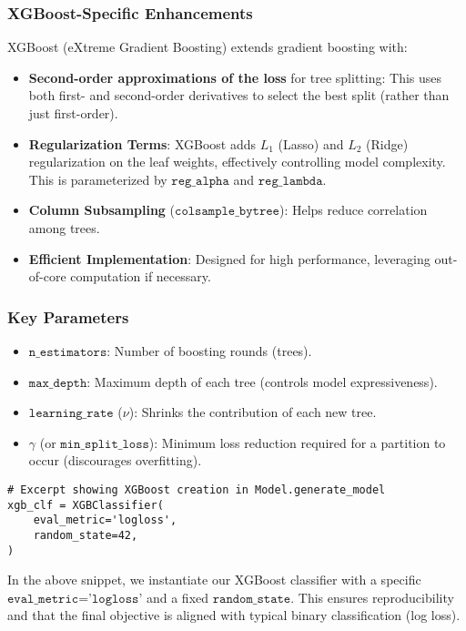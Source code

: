 \documentclass[12pt]{article}
\begin{document}
\subsubsection{XGBoost-Specific Enhancements}
XGBoost (eXtreme Gradient Boosting) extends gradient boosting with:
\begin{itemize}[noitemsep]
    \item \textbf{Second-order approximations of the loss} for tree splitting: This uses both first- and second-order derivatives to select the best split (rather than just first-order).
    \item \textbf{Regularization Terms}: XGBoost adds \(L_1\) (Lasso) and \(L_2\) (Ridge) regularization on the leaf weights, effectively controlling model complexity. This is parameterized by \(\texttt{reg\_alpha}\) and \(\texttt{reg\_lambda}\).
    \item \textbf{Column Subsampling} (\(\texttt{colsample\_bytree}\)): Helps reduce correlation among trees.
    \item \textbf{Efficient Implementation}: Designed for high performance, leveraging out-of-core computation if necessary.
\end{itemize}

\subsubsection{Key Parameters}
\begin{itemize}[noitemsep]
    \item \(\texttt{n\_estimators}\): Number of boosting rounds (trees).
    \item \(\texttt{max\_depth}\): Maximum depth of each tree (controls model expressiveness).
    \item \(\texttt{learning\_rate}\) (\(\nu\)): Shrinks the contribution of each new tree.
    \item \(\gamma\) (or \(\texttt{min\_split\_loss}\)): Minimum loss reduction required for a partition to occur (discourages overfitting).
\end{itemize}

\begin{verbatim}
# Excerpt showing XGBoost creation in Model.generate_model
xgb_clf = XGBClassifier(
    eval_metric='logloss',
    random_state=42,
)
\end{verbatim}

\noindent In the above snippet, we instantiate our XGBoost classifier with a specific \(\texttt{eval\_metric='logloss'}\) and a fixed \(\texttt{random\_state}\). This ensures reproducibility and that the final objective is aligned with typical binary classification (log loss).
\end{document}

